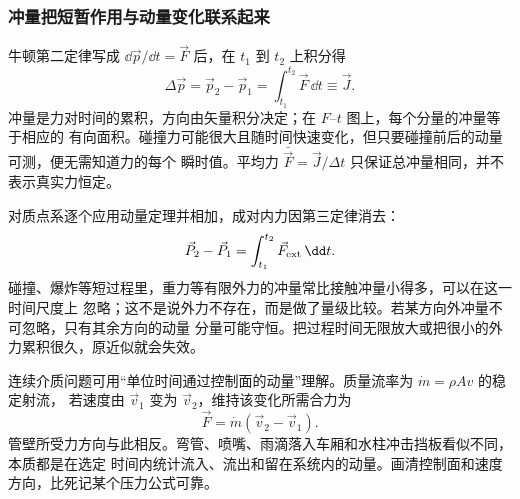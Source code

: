 \subsubsection*{冲量把短暂作用与动量变化联系起来}

牛顿第二定律写成 $\dd\vec p/\dd t=\vec F$ 后，在 $t_1$ 到 $t_2$ 上积分得
\begin{equation}
 \Delta\vec p=\vec p_2-\vec p_1
 =\int_{t_1}^{t_2}\vec F\,\dd t\equiv\vec J.
\end{equation}
冲量是力对时间的累积，方向由矢量积分决定；在 $F$--$t$ 图上，每个分量的冲量等于相应的
有向面积。碰撞力可能很大且随时间快速变化，但只要碰撞前后的动量可测，便无需知道力的每个
瞬时值。平均力 $\bar{\vec F}=\vec J/\Delta t$ 只保证总冲量相同，并不表示真实力恒定。

对质点系逐个应用动量定理并相加，成对内力因第三定律消去：
\begin{equation}
 \vec P_2-\vec P_1=\int_{t_1}^{t_2}\vec F_{\rm ext}\,\dd t.
\end{equation}
碰撞、爆炸等短过程里，重力等有限外力的冲量常比接触冲量小得多，可以在这一时间尺度上
忽略；这不是说外力不存在，而是做了量级比较。若某方向外冲量不可忽略，只有其余方向的动量
分量可能守恒。把过程时间无限放大或把很小的外力累积很久，原近似就会失效。

连续介质问题可用“单位时间通过控制面的动量”理解。质量流率为 $\dot m=\rho Av$ 的稳定射流，
若速度由 $\vec v_1$ 变为 $\vec v_2$，维持该变化所需合力为
\begin{equation}
 \vec F=\dot m(\vec v_2-\vec v_1).
\end{equation}
管壁所受力方向与此相反。弯管、喷嘴、雨滴落入车厢和水柱冲击挡板看似不同，本质都是在选定
时间内统计流入、流出和留在系统内的动量。画清控制面和速度方向，比死记某个压力公式可靠。
